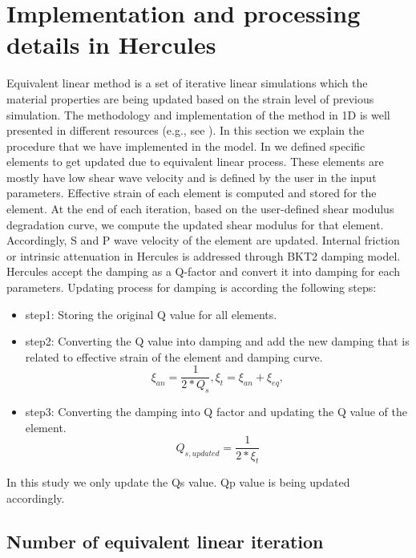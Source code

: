 
\section{Implementation and processing details in Hercules}

Equivalent linear method is a set of iterative linear simulations which the material properties are being updated based on the strain level of previous simulation. The methodology and implementation of the method in 1D is well presented in different resources (e.g., see \citet{Kramer1996geotechnical}). In this section we explain the procedure that we have implemented in the model. In we defined specific elements to get updated due to equivalent linear process. These elements are mostly have low shear wave velocity and is defined by the user in the input parameters. Effective strain of each element is computed and stored for the element. At the end of each iteration, based on the user-defined shear modulus degradation curve, we compute the updated shear modulus for that element. Accordingly, S and P wave velocity of the element are updated. Internal friction or intrinsic attenuation in Hercules is addressed through BKT2 damping model. Hercules accept the damping as a Q-factor and convert it into damping for each parameters.  Updating process for damping is according the following steps:

\begin{itemize}
 \item step1: Storing the original Q value for all elements.
 \item step2: Converting the Q value into damping and add the new damping that is related to effective strain of the element and damping curve.
\begin{equation}
\xi_{an}=\frac{1}{2*Q_s}, 
\xi_{t}=\xi_{an} + \xi_{eq},
\end{equation}
\item step3: Converting the damping into Q factor and updating the Q value of the element. 
\begin{equation}
Q_{s,updated} = \frac{1}{2*\xi_{t}}
\end{equation}
\end{itemize}

In this study we only update the Qs value. Qp value is being updated accordingly.  


\subsection{Number of equivalent linear iteration}

